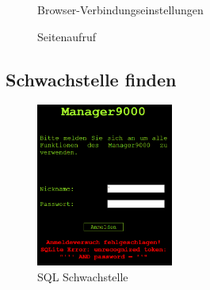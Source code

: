 \documentclass[12pt,a4paper,titlepage,oneside]{scrartcl}
\begin{document}
\begin{figure}[h!]
  \centering
  \caption{Browser-Verbindungseinstellungen}
  \label{fig:proxy}
\end{figure}

\begin{figure}[h!]
  \centering
  \caption{Seitenaufruf}
  \label{fig:enterSite}
\end{figure}

\pagebreak

\subsection{Schwachstelle finden}

\begin{figure}
    \includegraphics[width=0.4\textwidth]{./imgs/manager9000/m9000_sql_error1.png}
  \caption{SQL Schwachstelle}
  \label{fig:sql_weakness}
\end{figure}
\end{document}
